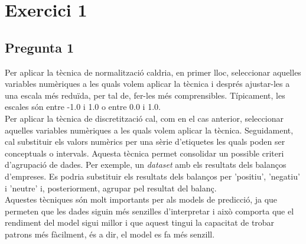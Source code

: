 \documentclass[a4paper,12pt]{report}
\begin{document}
\thispagestyle{empty}
	\begin{titlepage}
		\maketitle
		\thispagestyle{empty}
	\end{titlepage}
	\cleardoublepage
	\newpage

\thispagestyle{empty}
\tableofcontents
\thispagestyle{empty}
\newpage
{}
\section*{Exercici 1}
\subsection*{Pregunta 1}
Per aplicar la tècnica de normalització caldria, en primer lloc, seleccionar aquelles variables numèriques a les quals volem aplicar la tècnica i després ajustar-les a una escala més reduïda, per tal de, fer-les més comprensibles. Típicament, les escales són entre -1.0 i 1.0 o entre 0.0 i 1.0.\\
Per aplicar la tècnica de discretització cal, com en el cas anterior, seleccionar aquelles variables numèriques a les quals volem aplicar la tècnica. Seguidament, cal substituir els valors numèrics per una sèrie d'etiquetes les quals poden ser conceptuals o intervals. Aquesta tècnica permet consolidar un possible criteri d'agrupació de dades. Per exemple, un \textit{dataset} amb els resultats dels balanços d'empreses. Es podria substituir els resultats dels balanços per 'positiu', 'negatiu' i 'neutre' i, posteriorment, agrupar pel resultat del balanç.\\
Aquestes tècniques són molt importants per als models de predicció, ja que permeten que les dades siguin més senzilles d'interpretar i això comporta que el rendiment del model sigui millor i que aquest tingui la capacitat de trobar patrons més fàcilment, és a dir, el model es fa més senzill.
\end{document}
